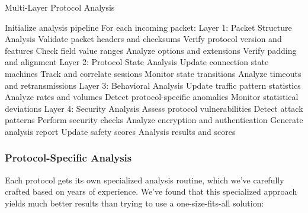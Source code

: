 \documentclass[conference]{IEEEtran}
\begin{document}
\begin{algorithm}[H]
\caption{Multi-Layer Protocol Analysis}
\begin{algorithmic}[1]
\STATE Initialize analysis pipeline
\STATE For each incoming packet:
\STATE \quad Layer 1: Packet Structure Analysis
\STATE \quad \quad Validate packet headers and checksums
\STATE \quad \quad Verify protocol version and features
\STATE \quad \quad Check field value ranges
\STATE \quad \quad Analyze options and extensions
\STATE \quad \quad Verify padding and alignment
\STATE \quad Layer 2: Protocol State Analysis
\STATE \quad \quad Update connection state machines
\STATE \quad \quad Track and correlate sessions
\STATE \quad \quad Monitor state transitions
\STATE \quad \quad Analyze timeouts and retransmissions
\STATE \quad Layer 3: Behavioral Analysis
\STATE \quad \quad Update traffic pattern statistics
\STATE \quad \quad Analyze rates and volumes
\STATE \quad \quad Detect protocol-specific anomalies
\STATE \quad \quad Monitor statistical deviations
\STATE \quad Layer 4: Security Analysis
\STATE \quad \quad Assess protocol vulnerabilities
\STATE \quad \quad Detect attack patterns
\STATE \quad \quad Perform security checks
\STATE \quad \quad Analyze encryption and authentication
\STATE \quad Generate analysis report
\STATE \quad Update safety scores
\RETURN Analysis results and scores
\end{algorithmic}
\end{algorithm}

\subsubsection{Protocol-Specific Analysis}
Each protocol gets its own specialized analysis routine, which we've carefully crafted based on years of experience. We've found that this specialized approach yields much better results than trying to use a one-size-fits-all solution:
\end{document}
